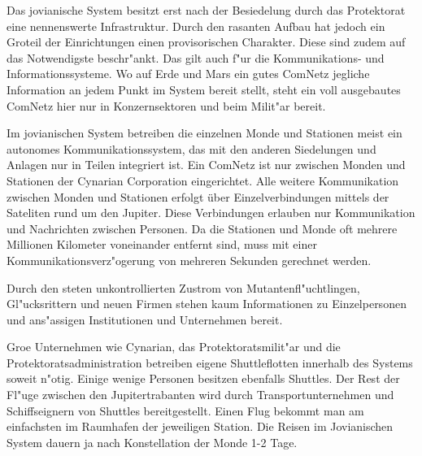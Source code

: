 
Das jovianische System besitzt erst nach der Besiedelung durch das Protektorat eine nennenswerte Infrastruktur. Durch den rasanten Aufbau hat jedoch ein Gro\3teil der Einrichtungen einen provisorischen Charakter. Diese sind zudem auf das Notwendigste beschr"ankt. Das gilt auch f"ur die Kommunikations- und Informationssysteme. Wo auf Erde und Mars ein gutes ComNetz jegliche Information an jedem Punkt im System bereit stellt, steht ein voll ausgebautes ComNetz hier nur in Konzernsektoren und beim Milit"ar bereit.

Im jovianischen System  betreiben die einzelnen Monde und Stationen meist ein autonomes Kommunikationssystem, das mit den anderen Siedelungen und Anlagen nur in Teilen integriert ist. Ein ComNetz ist nur zwischen Monden und Stationen der Cynarian Corporation eingerichtet. Alle weitere Kommunikation zwischen Monden und Stationen erfolgt über Einzelverbindungen mittels der Sateliten rund um den Jupiter. Diese Verbindungen erlauben nur Kommunikation und Nachrichten zwischen Personen. Da die Stationen und Monde oft mehrere Millionen Kilometer voneinander entfernt sind, muss mit einer Kommunikationsverz"ogerung von mehreren Sekunden gerechnet werden.

Durch den steten unkontrollierten Zustrom von Mutantenfl"uchtlingen, Gl"ucksrittern und neuen Firmen stehen kaum Informationen zu Einzelpersonen und ans"assigen Institutionen und Unternehmen bereit.


Gro\3e Unternehmen wie Cynarian, das Protektoratsmilit"ar und die Protektoratsadministration betreiben eigene Shuttleflotten innerhalb des Systems soweit n"otig. Einige wenige Personen besitzen ebenfalls Shuttles. Der Rest der Fl"uge zwischen den Jupitertrabanten wird durch Transportunternehmen und Schiffseignern von Shuttles bereitgestellt. Einen Flug bekommt man am einfachsten im Raumhafen der jeweiligen Station. Die Reisen im Jovianischen System dauern ja nach Konstellation der Monde 1-2 Tage.
